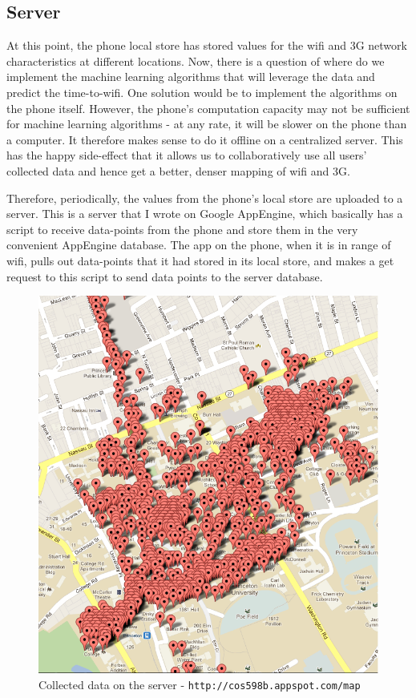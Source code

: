 \documentclass[12pt, fleqn]{article}
\begin{document}
\subsection{Server} 
\label{time-to-wifi-server}

At this point, the phone local store has stored values for the wifi and 3G network 
characteristics at different locations. Now, there is a question of where do we implement the machine 
learning algorithms that will leverage the data and predict the time-to-wifi. 
One solution would be to implement the algorithms on the phone itself. However, 
the phone's computation capacity may not be sufficient for machine 
learning algorithms - at any rate, it will be slower on the phone than a computer. It therefore makes 
sense to do it offline on a centralized server. This has the happy side-effect 
that it allows us to collaboratively use all users' collected data and hence 
get a better, denser mapping of wifi and 3G. 

Therefore, periodically, the values from the phone's local store are uploaded to a server. This is a server that I 
wrote on Google AppEngine, which basically has a script to receive 
data-points from the phone and store them in the very convenient AppEngine 
database. The app on the phone, when it is in range of wifi, pulls out data-points that it 
had stored in its local store, and makes a get request to this script to send data points to the 
server database. 

\medskip
\begin{figure}[htp]
\centering
\includegraphics[scale=0.5]{img/map3033.png}
\caption{Collected data on the server - \texttt{http://cos598b.appspot.com/map}\label{fig-map-data}}
\end{figure}
\medskip
\end{document}
